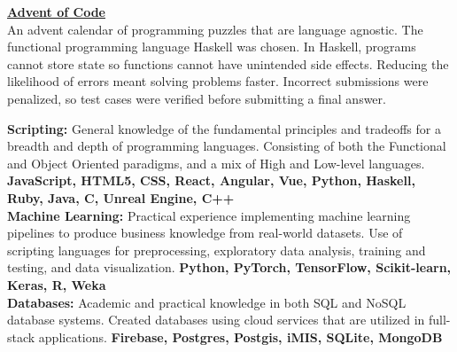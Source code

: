 \documentclass[9pt]{developercv}
\begin{document}
\textbf{\href{https://github.com/woodRock/verbose-computing-machine}{Advent of Code}} \\
An advent calendar of programming puzzles that are language agnostic. The functional programming language Haskell was chosen. In Haskell, programs cannot store state so functions cannot have unintended side effects. Reducing the likelihood of errors meant solving problems faster. Incorrect submissions were penalized, so test cases were verified before submitting a final answer. \\




\textbf{Scripting:} General knowledge of the fundamental principles and tradeoffs for a breadth and depth of programming languages. Consisting of both the Functional and Object Oriented paradigms, and a mix of High and Low-level languages. \textbf{JavaScript, HTML5, CSS, React, Angular, Vue, Python, Haskell, Ruby, Java, C, Unreal Engine, C++} \\

\textbf{Machine Learning:} Practical experience implementing machine learning pipelines to produce business knowledge from real-world datasets. Use of scripting languages for preprocessing, exploratory data analysis, training and testing, and data visualization. \textbf{Python, PyTorch, TensorFlow, Scikit-learn, Keras, R, Weka} \\

\textbf{Databases:} Academic and practical knowledge in both SQL and NoSQL database systems. Created databases using cloud services that are utilized in full-stack applications. \textbf{Firebase, Postgres, Postgis, iMIS, SQLite, MongoDB} \\
\end{document}
